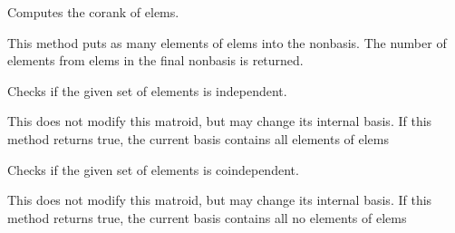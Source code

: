\documentclass[letterpaper,12pt,english]{sphinxmanual}
\begin{document}
\begin{fulllineitems}

\begin{fulllineitems}
\label{\detokenize{api/modules:cbmpy.fluxmodules.matroid.Matroid.corank}}
\pysigstartsignatures
\pysiglinewithargsret
{}
{}
{}
\pysigstopsignatures
\sphinxAtStartPar
Computes the corank of elems.

\sphinxAtStartPar
This method puts as many elements of elems into the non\sphinxhyphen{}basis. The number of
elements from elems in the final non\sphinxhyphen{}basis is returned.

\end{fulllineitems}


\begin{fulllineitems}
\label{\detokenize{api/modules:cbmpy.fluxmodules.matroid.Matroid.isIndependent}}
\pysigstartsignatures
\pysiglinewithargsret
{}
{}
{}
\pysigstopsignatures
\sphinxAtStartPar
Checks if the given set of elements is independent.

\sphinxAtStartPar
This does not modify this matroid, but may change its internal basis. If this
method returns true, the current basis contains all elements of elems

\end{fulllineitems}


\begin{fulllineitems}
\label{\detokenize{api/modules:cbmpy.fluxmodules.matroid.Matroid.isCoIndependent}}
\pysigstartsignatures
\pysiglinewithargsret
{}
{}
{}
\pysigstopsignatures
\sphinxAtStartPar
Checks if the given set of elements is coindependent.

\sphinxAtStartPar
This does not modify this matroid, but may change its internal basis. If this
method returns true, the current basis contains all no elements of elems


\end{fulllineitems}
\end{fulllineitems}
\end{document}
